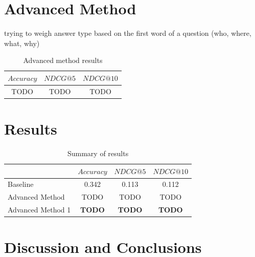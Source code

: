 \documentclass[sigconf]{acmart}
\begin{document}
\section{Advanced Method}

trying to weigh answer type based on the first word of a question (who, where, what, why) 

\begin{table}[h]
    \centering
    \caption{Advanced method results}
    \begin{tabular}{c|c|c}
    $Accuracy$ & $NDCG@5$ & $NDCG@10$ \\
    \hline
    TODO & TODO & TODO
    \end{tabular}
    \label{tab:baseline_res}
\end{table}


\section{Results}


\begin{table}[h]
\begin{center}
\caption{Summary of results}
\begin{tabular}{l|c|c|c}
     & $Accuracy$ & $NDCG@5$ & $NDCG@10$ \\
    \hline
    Baseline & 0.342 &  0.113 & 0.112 \\
    Advanced Method & TODO & TODO &  TODO \\
    Advanced Method 1 & \textbf{TODO} & \textbf{TODO} & \textbf{TODO} 
\end{tabular}
\label{table:1}
\end{center}
\end{table}



\section{Discussion and Conclusions}
\end{document}
